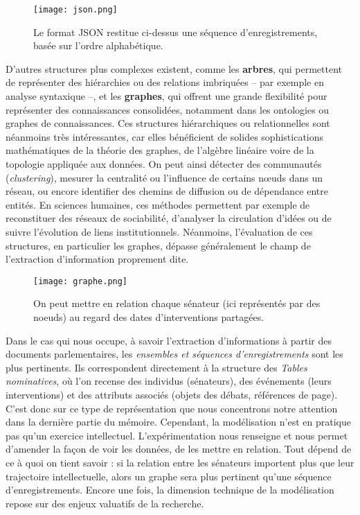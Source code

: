 \begin{figure}[htbp]
\centering
\texttt{[image: json.png]}
\caption{Le format JSON restitue ci-dessus une séquence d'enregistrements, basée sur l'ordre alphabétique.}
\label{fig:json}
\end{figure}

D’autres structures plus complexes existent, comme les \textbf{arbres}, qui permettent de représenter des hiérarchies ou des relations imbriquées -- par exemple en analyse syntaxique --, et les \textbf{graphes}, qui offrent une grande flexibilité pour représenter des connaissances consolidées, notamment dans les ontologies ou graphes de connaissances. Ces structures hiérarchiques ou relationnelles sont néanmoins très intéressantes, car elles bénéficient de solides sophistications mathématiques de la théorie des graphes, de l'algèbre linéaire voire de la topologie appliquée aux données. On peut ainsi détecter des communautés (\emph{clustering}), mesurer la centralité ou l’influence de certains nœuds dans un réseau, ou encore identifier des chemins de diffusion ou de dépendance entre entités. En sciences humaines, ces méthodes permettent par exemple de reconstituer des réseaux de sociabilité, d’analyser la circulation d’idées ou de suivre l’évolution de liens institutionnels. Néanmoins, l’évaluation de ces structures, en particulier les graphes, dépasse généralement le champ de l’extraction d’information proprement dite.

\begin{figure}[htbp]
\centering
\texttt{[image: graphe.png]}
\caption{On peut mettre en relation chaque sénateur (ici représentés par des noeuds) au regard des dates d'interventions partagées.}
\label{fig:graphe}
\end{figure}

Dans le cas qui nous occupe, à savoir l’extraction d’informations à partir des documents parlementaires, les \emph{ensembles et séquences d’enregistrements} sont les plus pertinents. Ils correspondent directement à la structure des \emph{Tables nominatives}, où l’on recense des individus (sénateurs), des événements (leurs interventions) et des attributs associés (objets des débats, références de page). C’est donc sur ce type de représentation que nous concentrons notre attention dans la dernière partie du mémoire. Cependant, la modélisation n'est en pratique pas qu'un exercice intellectuel. L'expérimentation nous renseigne et nous permet d'amender la façon de voir les données, de les mettre en relation. Tout dépend de ce à quoi on tient savoir : si la relation entre les sénateurs importent plus que leur trajectoire intellectuelle, alors un graphe sera plus pertinent qu'une séquence d'enregistrements. Encore une fois, la dimension technique de la modélisation repose sur des enjeux valuatifs de la recherche.

